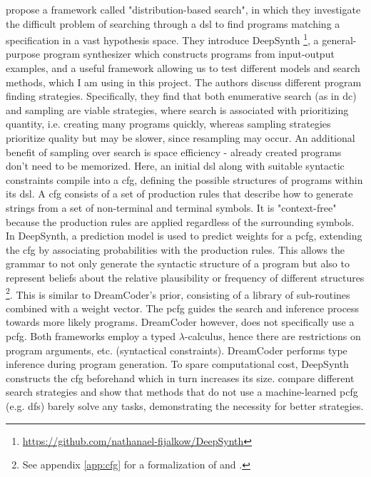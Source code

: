 \citet{fijalkowScalingNeuralProgram2021} propose a framework called "distribution-based search", in which they investigate the difficult problem of searching through a \acrshort{dsl} to find programs matching a specification in a vast hypothesis space.
They introduce DeepSynth \footnote{\url{https://github.com/nathanael-fijalkow/DeepSynth}}, a general-purpose program synthesizer which constructs programs from input-output examples, and a useful framework allowing us to test different models and search methods, which I am using in this project.
The authors discuss different program finding strategies. Specifically, they find that both enumerative search (as in \acrshort{dc}) and sampling are viable strategies, where search is associated with prioritizing quantity, i.e. creating many programs quickly, whereas sampling strategies prioritize quality but may be slower, since resampling may occur. An additional benefit of sampling over search is space efficiency - already created programs don't need to be memorized.
Here, an initial \acrshort{dsl} along with suitable syntactic constraints compile into a \acrfull{cfg}, defining the possible structures of programs within its \acrshort{dsl}. A \acrshort{cfg} consists of a set of production rules that describe how to generate strings from a set of non-terminal and terminal symbols. It is "context-free" because the production rules are applied regardless of the surrounding symbols.
In DeepSynth, a prediction model is used to predict weights for a \acrfull{pcfg}, extending the \acrshort{cfg} by associating probabilities with the production rules. This allows the grammar to not only generate the syntactic structure of a program but also to represent beliefs about the relative plausibility or frequency of different structures \footnote{See appendix \autoref{app:cfg} for a formalization of  and .}. This is similar to DreamCoder's prior, consisting of a library of sub-routines combined with a weight vector. The \acrshort{pcfg} guides the search and inference process towards more likely programs. DreamCoder however, does not specifically use a \acrshort{pcfg}. Both frameworks employ a typed $\lambda$-calculus, hence there are restrictions on program arguments, etc. (syntactical constraints). DreamCoder performs type inference during program generation. To spare computational cost, DeepSynth constructs the \acrshort{cfg} beforehand which in turn increases its size.
\citet{fijalkowScalingNeuralProgram2021} compare different search strategies and show that methods that do not use a machine-learned \acrshort{pcfg} (e.g. \acrfull{dfs}) barely solve any tasks, demonstrating the necessity for better strategies.


